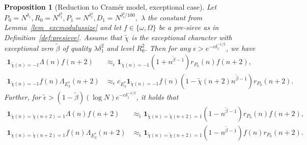 \documentclass[12pt]{amsart}
\newtheorem{prop}[theorem]{Proposition}
\theoremstyle{definition}
\theoremstyle{remark}
\numberwithin{equation}{section}
\newcommand{\1}{\mathbf{1}}
\begin{document}
\begin{prop}[Reduction to Cram\'er model, exceptional case]\label{prop_reducetoroughexc} 
     Let $P_0=N^{\delta_1},R_0=N^{\delta_1^3},P_1=N^{\delta_1^4},D_1=N^{\delta_1^3/100},$ $\lambda$ the constant from Lemma~\ref{lem_excmodulussize} and let $f\in\{\omega,\Omega\}$ be a pre-sieve as in Definition~\ref{def:presieve}. Assume that $\widetilde{\chi}$ is the exceptional character with exceptional zero $\widetilde{\beta}$ of quality $\lambda \delta_1^2$ and level $R_0^2$. Then for any $\epsilon>e^{-c \delta_1^{-1/2}}$, we have
    \begin{align*}
	   \1_{\widetilde{\chi}(n)=-1}\Lambda(n)f(n+2)&\approx_{\epsilon}  \1_{\widetilde{\chi}(n)=-1}(1+n^{\widetilde{\beta}-1}) r_{P_0}(n)f(n+ 2),\\
	   \1_{\widetilde{\chi}(n)=-1}f(n)\Lambda_{E_3^*}(n+2)&\approx_{\epsilon} c_{E_3^*}  \1_{\widetilde{\chi}(n)=-1}f(n)(1-\widetilde{\chi}(n+2)n^{\widetilde{\beta}-1})r_{P_0}(n+2).
	\end{align*}
	Further, for $\widetilde{\epsilon}>(1-\widetilde{\beta})(\log N)e^{-c \delta_1^{-1/2}}$, it holds that
	\begin{align*}
		\1_{\widetilde{\chi}(n)=\widetilde{\chi}(n+2)=1}\Lambda(n)f(n+2)&\approx_{\widetilde{\epsilon}} \1_{\widetilde{\chi}(n)=\widetilde{\chi}(n+2)=1}(1-n^{\widetilde{\beta}-1} )r_{P_0}(n)f(n+2),\\
		\1_{\widetilde{\chi}(n)=\widetilde{\chi}(n+2)=1}f(n)\Lambda_{E_3^*}(n+2)&\approx_{\widetilde{\epsilon}} \1_{\widetilde{\chi}(n)=\widetilde{\chi}(n+2)=1}(1-n^{\widetilde{\beta}-1})f(n) r_{P_0}(n+2) .
	\end{align*}
\end{prop}

	
\end{document}
